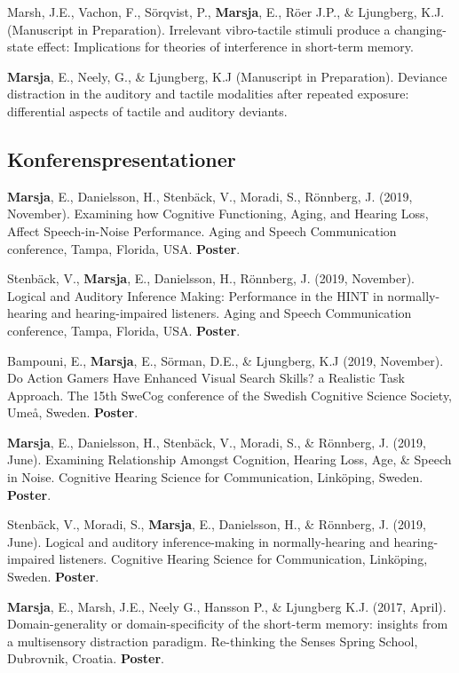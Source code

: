 \documentclass[]{article}
\begin{document}
Marsh, J.E., Vachon, F., Sörqvist, P., \textbf{Marsja}, E., Röer J.P.,
\& Ljungberg, K.J. (Manuscript in Preparation). Irrelevant vibro-tactile
stimuli produce a changing-state effect: Implications for theories of
interference in short-term memory.

\textbf{Marsja}, E., Neely, G., \& Ljungberg, K.J (Manuscript in
Preparation). Deviance distraction in the auditory and tactile
modalities after repeated exposure: differential aspects of tactile and
auditory deviants.

\hypertarget{konferenspresentationer}{%
\subsection{Konferenspresentationer}\label{konferenspresentationer}}

\textbf{Marsja}, E., Danielsson, H., Stenbäck, V., Moradi, S., Rönnberg,
J. (2019, November). Examining how Cognitive Functioning, Aging, and
Hearing Loss, Affect Speech-in-Noise Performance. Aging and Speech
Communication conference, Tampa, Florida, USA. \textbf{Poster}.

Stenbäck, V., \textbf{Marsja}, E., Danielsson, H., Rönnberg, J. (2019,
November). Logical and Auditory Inference Making: Performance in the
HINT in normally-hearing and hearing-impaired listeners. Aging and
Speech Communication conference, Tampa, Florida, USA. \textbf{Poster}.

Bampouni, E., \textbf{Marsja}, E., Sörman, D.E., \& Ljungberg, K.J
(2019, November). Do Action Gamers Have Enhanced Visual Search Skills? a
Realistic Task Approach. The 15th SweCog conference of the Swedish
Cognitive Science Society, Umeå, Sweden. \textbf{Poster}.

\textbf{Marsja}, E., Danielsson, H., Stenbäck, V., Moradi, S., \&
Rönnberg, J. (2019, June). Examining Relationship Amongst Cognition,
Hearing Loss, Age, \& Speech in Noise. Cognitive Hearing Science for
Communication, Linköping, Sweden. \textbf{Poster}.

Stenbäck, V., Moradi, S., \textbf{Marsja}, E., Danielsson, H., \&
Rönnberg, J. (2019, June). Logical and auditory inference-making in
normally-hearing and hearing-impaired listeners. Cognitive Hearing
Science for Communication, Linköping, Sweden. \textbf{Poster}.

\textbf{Marsja}, E., Marsh, J.E., Neely G., Hansson P., \& Ljungberg
K.J. (2017, April). Domain-generality or domain-specificity of the
short-term memory: insights from a multisensory distraction paradigm.
Re-thinking the Senses Spring School, Dubrovnik, Croatia.
\textbf{Poster}.
\end{document}
